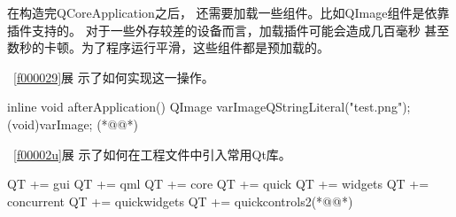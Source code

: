 在构造完QCoreApplication之后，
还需要加载一些组件。比如QImage组件是依靠插件支持的。
对于一些外存较差的设备而言，加载插件可能会造成几百毫秒
甚至数秒的卡顿。为了程序运行平滑，这些组件都是预加载的。

\filesourcenumbernameone\ \ref{f000029}展
示了如何实现这一操作。

\label{f000029}    %
\FloatBarrier                                  %
\begin{thebookfilesourceone}[escapeinside={(*@}{@*)},
caption=GoodLuck,
title=\filesourcenumbernameone \thefilesourcenumber
,firstnumber=54]
inline void afterApplication() {
    {
        QImage varImage{QStringLiteral("test.png")};
        (void)varImage;
    }
}(*@\marginpar[\hfill\setlength\fboxsep{2pt}\fbox{\footnotesize{\kaishu\parbox{1em}{\setlength{\baselineskip}{2pt}\filesourcenumbernameone}}\footnotesize{\thefilesourcenumber}}]{\setlength\fboxsep{2pt}\fbox{\footnotesize{\kaishu\parbox{1em}{\setlength{\baselineskip}{2pt}\filesourcenumbernameone}}\footnotesize{\thefilesourcenumber}}}@*)\end{thebookfilesourceone}          %
\addtocounter{lstlisting}{-1}   %

\filesourcenumbernameone\ \ref{f00002u}展
示了如何在工程文件中引入常用Qt库。

\label{f00002u}    %
\FloatBarrier                                  %
\begin{thebookfilesourceone}[escapeinside={(*@}{@*)},
caption=GoodLuck,
title=\filesourcenumbernameone \thefilesourcenumber
]
QT += gui
QT += qml
QT += core
QT += quick
QT += widgets
QT += concurrent
QT += quickwidgets
QT += quickcontrols2(*@\marginpar[\hfill\setlength\fboxsep{2pt}\fbox{\footnotesize{\kaishu\parbox{1em}{\setlength{\baselineskip}{2pt}\filesourcenumbernameone}}\footnotesize{\thefilesourcenumber}}]{\setlength\fboxsep{2pt}\fbox{\footnotesize{\kaishu\parbox{1em}{\setlength{\baselineskip}{2pt}\filesourcenumbernameone}}\footnotesize{\thefilesourcenumber}}}@*)\end{thebookfilesourceone}          %
\addtocounter{lstlisting}{-1}   %

